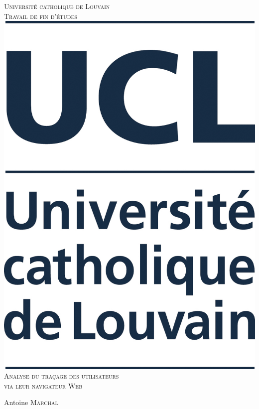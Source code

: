 \documentclass[a4paper, twoside, 12pt, french]{report}
\begin{document}
\begin{titlepage}
\center

\textsc{\LARGE Université catholique de Louvain}\\[1cm]
\textsc{\Large Travail de fin d'études}\\[2cm]

\includegraphics[scale=.15]{UCL_mention_pantone282.jpg}\\[1.5cm]

\textsc{\Large Analyse du traçage des utilisateurs\\via leur navigateur Web}\\[1.5cm]

\begin{minipage}{0.4\textwidth}
\begin{center}
\large Antoine \textsc{Marchal}
\end{center}
\end{minipage}\\[2cm]


\end{titlepage}
\end{document}
